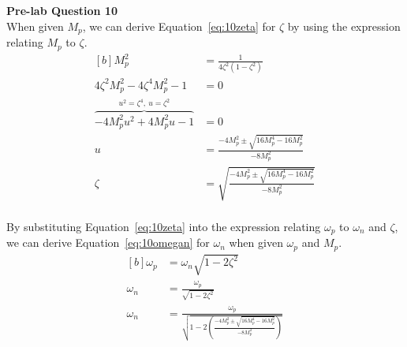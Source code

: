 \documentclass[12pt]{article}
\begin{document}
\textbf{Pre-lab Question 10} \\
When given $M_p$, we can derive Equation~\ref{eq:10zeta} for $\zeta$ by using the expression relating $M_p$ to $\zeta$.
\begin{equation} \label{eq:10zeta}
\begin{aligned}[b]
    M_p^2 &= \frac{1}{4\zeta^2 (1 - \zeta^2)} \\
    4\zeta^2 M_p^2 - 4\zeta^4 M_p^2 - 1 &= 0 \\
    \overbrace{-4 M_p^2 u^2 + 4 M_p^2 u - 1}^{u^2 = \zeta^4, \ u = \zeta^2} &= 0 \\
    u &= \frac{-4 M_p^2 \pm \sqrt{16 M_p^4 - 16 M_p^2}}{-8 M_p^2} \\
    \zeta &= \sqrt{\frac{-4 M_p^2 \pm \sqrt{16 M_p^4 - 16 M_p^2}}{-8 M_p^2}} \\
\end{aligned}
\end{equation}

By substituting Equation~\ref{eq:10zeta} into the expression relating $\omega_p$ to $\omega_n$ and $\zeta$, we can derive Equation~\ref{eq:10omegan} for $\omega_n$ when given $\omega_p$ and $M_p$.
\begin{equation} \label{eq:10omegan}
\begin{aligned}[b]
    \omega_p &= \omega_n \sqrt{1 - 2\zeta^2} \\
    \omega_n &= \frac{\omega_p}{\sqrt{1 - 2\zeta^2}} \\
    \omega_n &= \frac{\omega_p}{\sqrt{1 - 2 \left( \frac{-4 M_p^2 \pm \sqrt{16 M_p^4 - 16 M_p^2}}{-8 M_p^2} \right)}}
\end{aligned}
\end{equation}
\end{document}
